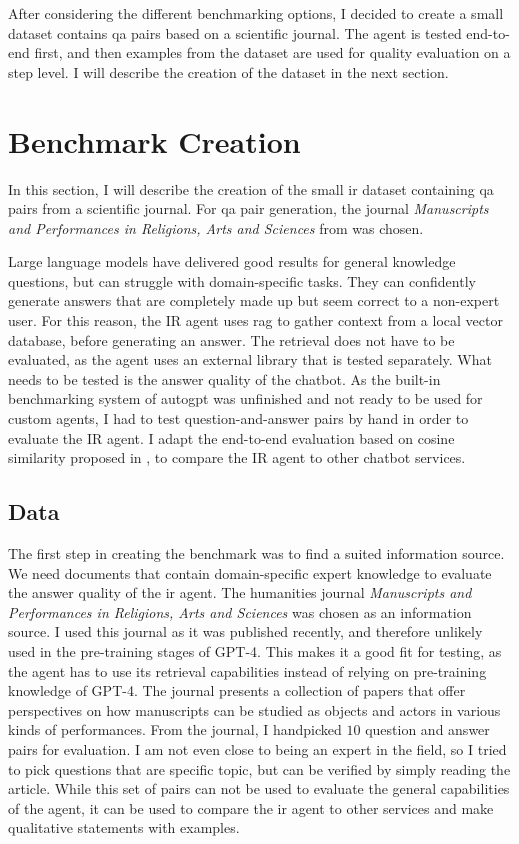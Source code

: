 \documentclass[../main.tex]{subfiles}
\begin{document}
After considering the different benchmarking options, I decided to create a small
dataset contains \gls{qa} pairs based on a scientific journal.
The agent is tested end-to-end first, and then examples from the dataset
are used for quality evaluation on a step level.
I will describe the creation of the dataset in the next section.


\section{Benchmark Creation}

In this section, I will describe the creation of the small \gls{ir} dataset
containing \gls{qa} pairs from a scientific journal.
For \gls{qa} pair generation, the journal
\emph{Manuscripts and Performances in Religions, Arts and Sciences}
from \citeauthor{Brita2023} \cite{Brita2023} was chosen.

Large language models have delivered good results for general knowledge questions,
but can struggle with domain-specific tasks.
They can confidently generate answers that are completely made up but seem correct to a non-expert user.
For this reason, the IR agent uses \gls{rag} to gather context from a local vector database,
before generating an answer.
The retrieval does not have to be evaluated, as the agent uses an external library that is tested separately.
What needs to be tested is the answer quality of the chatbot.
As the built-in benchmarking system of \gls{autogpt} was unfinished and not ready to be used for custom agents,
I had to test question-and-answer pairs by hand in order to evaluate the IR agent.
I adapt the end-to-end evaluation based on cosine similarity proposed in \cite{Banerjee2023},
to compare the IR agent to other chatbot services.

\subsection{Data}

The first step in creating the benchmark was to find a suited information source.
We need documents that contain domain-specific expert knowledge
to evaluate the answer quality of the \gls{ir} agent.
The humanities journal \emph{Manuscripts and Performances in Religions, Arts and Sciences}
\citeauthor{Brita2023} \cite{Brita2023} was chosen as an information source.
I used this journal as it was published recently,
and therefore unlikely used in the pre-training stages of GPT-4.
This makes it a good fit for testing, as the agent has to use its retrieval
capabilities instead of relying on pre-training knowledge of GPT-4.
The journal presents a collection of papers that offer perspectives on how
manuscripts can be studied as objects and actors in various kinds of performances.
From the journal, I handpicked $10$ question and answer pairs for evaluation.
I am not even close to being an expert in the field, so I tried to pick questions
that are specific topic, but can be verified by simply reading the article.
While this set of pairs can not be used to evaluate the general capabilities of the agent,
it can be used to compare the \gls{ir} agent to other services
and make qualitative statements with examples.
\end{document}
